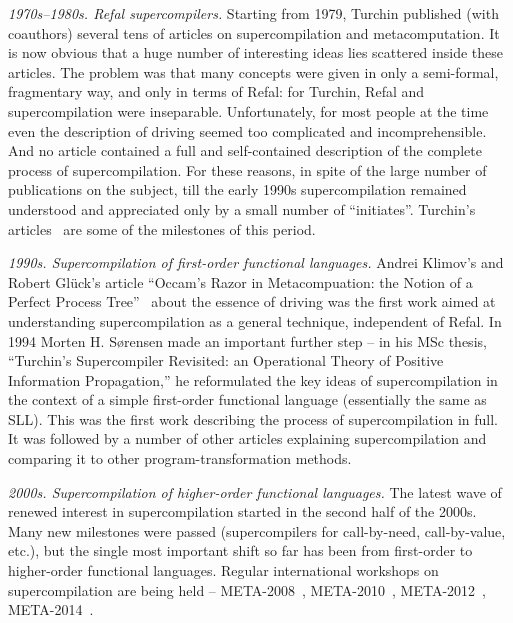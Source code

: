 \begin{longitem}

\item \emph{1970s--1980s. Refal supercompilers.} Starting from 1979, Turchin
published (with coauthors) several tens of articles on supercompilation 
and metacomputation. 
It is now obvious that a huge number of interesting ideas lies scattered 
inside these articles.
The problem was that many concepts were given in only a semi-formal, fragmentary way,
and only in terms of Refal: for Turchin, Refal and supercompilation were inseparable.
Unfortunately, for most people at the time even the description of
driving seemed too complicated and incomprehensible.
And no article contained a full and self-contained description
of the complete process of supercompilation.
For these reasons, in spite of the large number of publications on the subject,
till the early 1990s supercompilation remained understood and appreciated
only by a small number of ``initiates''.
Turchin's articles~\cite{Turchin1974EqTrans,Turchin1980Refal,Turchin1986Supercompiler,Turchin1988Generalization,Turchin1993Transformation,Turchin1996Supercompilation,Turchin1996Metacomputation}
are some of the milestones of this period.

\item \emph{1990s. Supercompilation of first-order functional languages.} Andrei
Klimov's and Robert Gl\"{u}ck's article
``Occam's Razor in Metacompuation: the Notion
of a Perfect Process Tree''~\cite{Gluck1993Occam} about the essence of driving
was the first work aimed at understanding supercompilation as a general technique,
independent of Refal.
In 1994 Morten H. S{\o}rensen made an important further step -- in his MSc thesis,
``Turchin's Supercompiler Revisited: an Operational Theory of Positive Information Propagation,''
\cite{Sorensen1994TurchinSupercompiler}
he reformulated the key ideas of supercompilation in the context of a simple
first-order functional language (essentially the same as SLL).
This was the first work describing the process of supercompilation in full.
It was followed by a number of other articles
\cite{Gluck1993Occam,Sorensen1994TurchinSupercompiler,Abramov1995meta,Sorensen1995Generalization,Gluck1996Roadmap,Sorensen1996Positive,Sorensen1998Introduction,Abramov2006meta2}
explaining supercompilation and comparing it to other program-transformation methods.

\item \emph{2000s. Supercompilation of higher-order functional languages.} The latest wave
of renewed interest in supercompilation started in the second half of the 2000s.
Many new milestones were passed (supercompilers for call-by-need, call-by-value, etc.),
but the single most important shift so far has been from first-order to higher-order functional
languages.
Regular international workshops on supercompilation are being held --
META-2008~\cite{Meta2008}, META-2010~\cite{Meta2010}, META-2012~\cite{Meta2012},
META-2014~\cite{Meta2014}.

\end{longitem}

